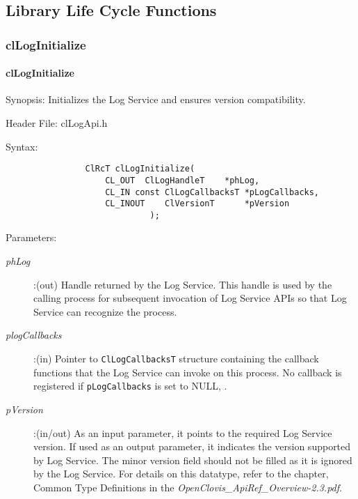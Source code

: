 \begin{flushleft}
\newpage
\section{Library Life Cycle Functions}
\subsubsection{clLogInitialize}
\hypertarget{pagelog101}{}\paragraph{cl\-Log\-Initialize}\label{pagelog101}
\begin{Desc}
\item[Synopsis:]Initializes the Log Service and ensures version compatibility.\end{Desc}
\begin{Desc}
\item[Header File:] clLogApi.h \end{Desc}
\begin{Desc}
\item[Syntax:]

\footnotesize\begin{verbatim}       
				ClRcT clLogInitialize(
					CL_OUT	ClLogHandleT	*phLog,
					CL_IN const ClLogCallbacksT	*pLogCallbacks,
					CL_INOUT	ClVersionT		*pVersion
						     );
\end{verbatim}
\normalsize
\end{Desc}
\begin{Desc}
\item[Parameters:] \begin{description}
\item[{\em phLog}]:(out) Handle returned by the Log Service. This handle is used by the calling process for subsequent invocation of Log Service APIs
so that Log Service can recognize the process.
\item[{\em plogCallbacks}]:(in) Pointer to {\tt{ClLogCallbacksT}} structure containing the callback functions that the Log Service can invoke on this
process. No callback is registered if {\tt{pLogCallbacks}} is set to NULL, . 
\item[{\em pVersion}]:(in/out) As an input parameter, it points to the required Log Service version. 
If used as an output parameter, it indicates the version supported by Log Service. The minor version field should not be filled as it is ignored by 
the Log Service. For details on this datatype, refer to the chapter, Common Type Definitions in the \textit{OpenClovis\_\-ApiRef\_\-Overview-2.3.pdf}.


\end{description}
\end{Desc}
\end{flushleft}
